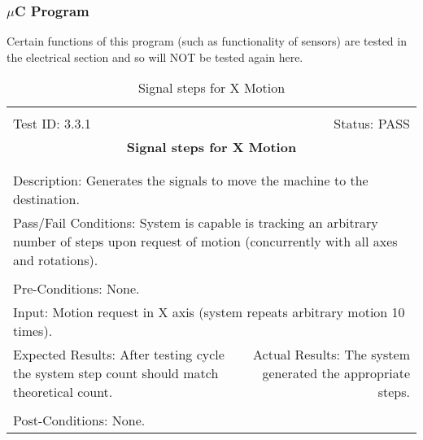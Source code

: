 \documentclass[titlepage]{article}
\begin{document}
\subsubsection{$\mu$C Program}
Certain functions of this program (such as functionality of sensors) are tested in the electrical section and so will NOT be tested again here.

\begin{center}
\begin{table}[h!]
\begin{tabular}{|l r|}\hline&\\[-2mm]
	Test ID: 3.3.1	&Status: PASS\\[-3mm]
	\multicolumn{2}{|c|}{\textbf{\large{Signal steps for X Motion}}}\\&\\\hline&\\[-3mm]
	\multicolumn{2}{|p{\textwidth}|}{Description: Generates the signals to move the machine to the destination.}\\\hline
	\multicolumn{2}{|p{\textwidth}|}{Pass/Fail Conditions: System is capable is tracking an arbitrary number of steps upon request of motion (concurrently with all axes and rotations).}\\[1mm]\hline&\\[-3mm]
	\multicolumn{2}{|p{\textwidth}|}{Pre-Conditions: None.}\\[4mm]
	\multicolumn{2}{|p{\textwidth}|}{Input: Motion request in X axis (system repeats arbitrary motion 10 times).}\\[2mm]\hline
	\multicolumn{1}{|p{0.49\textwidth}}{Expected Results: After testing cycle the system step count should match theoretical count.}	&\multicolumn{1}{|p{0.45\textwidth}|}{Actual Results: The system generated the appropriate steps.}\\\hline&\\[-3mm]
	\multicolumn{2}{|p{\textwidth}|}{Post-Conditions: None.}\\\hline
\end{tabular}
\caption{Signal steps for X Motion}
\end{table}
\end{center}
\end{document}
